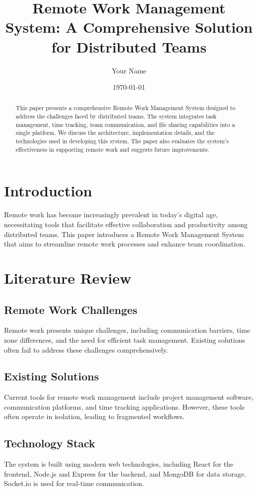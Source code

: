 \documentclass[12pt,a4paper]{article}
\title{Remote Work Management System: A Comprehensive Solution for Distributed Teams}
\author{Your Name}
\date{\today}
\begin{document}
\maketitle

\begin{abstract}
This paper presents a comprehensive Remote Work Management System designed to address the challenges faced by distributed teams. The system integrates task management, time tracking, team communication, and file sharing capabilities into a single platform. We discuss the architecture, implementation details, and the technologies used in developing this system. The paper also evaluates the system's effectiveness in supporting remote work and suggests future improvements.
\end{abstract}

\section{Introduction}
Remote work has become increasingly prevalent in today's digital age, necessitating tools that facilitate effective collaboration and productivity among distributed teams. This paper introduces a Remote Work Management System that aims to streamline remote work processes and enhance team coordination.

\section{Literature Review}
\subsection{Remote Work Challenges}
Remote work presents unique challenges, including communication barriers, time zone differences, and the need for efficient task management. Existing solutions often fail to address these challenges comprehensively.

\subsection{Existing Solutions}
Current tools for remote work management include project management software, communication platforms, and time tracking applications. However, these tools often operate in isolation, leading to fragmented workflows.

\subsection{Technology Stack}
The system is built using modern web technologies, including React for the frontend, Node.js and Express for the backend, and MongoDB for data storage. Socket.io is used for real-time communication.
\end{document}
